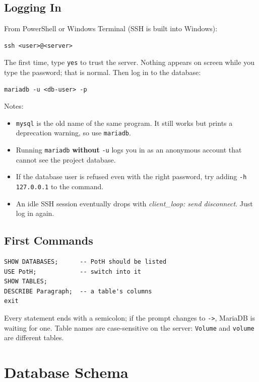 \documentclass[11pt]{article}
\newcommand{\code}[1]{\texttt{#1}}
\begin{document}
\subsection{Logging In}

From PowerShell or Windows Terminal (SSH is built into Windows):

\begin{lstlisting}
ssh <user>@<server>
\end{lstlisting}

The first time, type \code{yes} to trust the server. Nothing appears on
screen while you type the password; that is normal. Then log in to the
database:

\begin{lstlisting}
mariadb -u <db-user> -p
\end{lstlisting}

Notes:
\begin{itemize}
  \item \code{mysql} is the old name of the same program. It still works
  but prints a deprecation warning, so use \code{mariadb}.
  \item Running \code{mariadb} \textbf{without} \code{-u} logs you in as an
  anonymous account that cannot see the project database.
  \item If the database user is refused even with the right password, try
  adding \code{-h 127.0.0.1} to the command.
  \item An idle SSH session eventually drops with
  \textit{client\_loop: send disconnect}. Just log in again.
\end{itemize}

\subsection{First Commands}

\begin{lstlisting}
SHOW DATABASES;      -- PotH should be listed
USE PotH;            -- switch into it
SHOW TABLES;
DESCRIBE Paragraph;  -- a table's columns
exit
\end{lstlisting}

Every statement ends with a semicolon; if the prompt changes to \code{->},
MariaDB is waiting for one. Table names are case-sensitive on the server:
\code{Volume} and \code{volume} are different tables.

\section{Database Schema}
\end{document}
